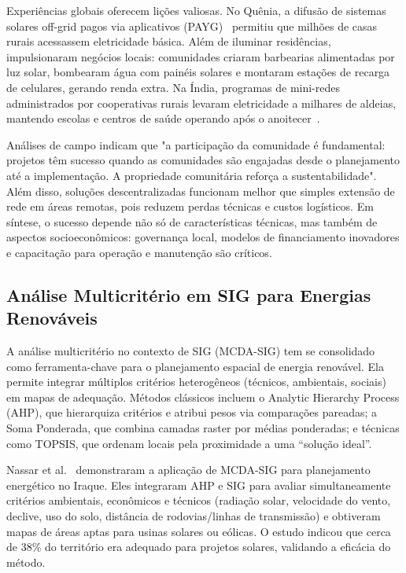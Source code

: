 \documentclass[12pt, a4paper]{article}
\begin{document}
Experiências globais oferecem lições valiosas. No Quênia, a difusão de sistemas solares off-grid pagos via aplicativos (PAYG)~\citep{Onyango2022} permitiu que milhões de casas rurais acessassem eletricidade básica. Além de iluminar residências, impulsionaram negócios locais: comunidades criaram barbearias alimentadas por luz solar, bombearam água com painéis solares e montaram estações de recarga de celulares, gerando renda extra. Na Índia, programas de mini-redes administrados por cooperativas rurais levaram eletricidade a milhares de aldeias, mantendo escolas e centros de saúde operando após o anoitecer~\citep{Mapako2021}.

Análises de campo indicam que "a participação da comunidade é fundamental: projetos têm sucesso quando as comunidades são engajadas desde o planejamento até a implementação. A propriedade comunitária reforça a sustentabilidade". Além disso, soluções descentralizadas funcionam melhor que simples extensão de rede em áreas remotas, pois reduzem perdas técnicas e custos logísticos. Em síntese, o sucesso depende não só de características técnicas, mas também de aspectos socioeconômicos: governança local, modelos de financiamento inovadores e capacitação para operação e manutenção são críticos.

\subsection{Análise Multicritério em SIG para Energias Renováveis}

A análise multicritério no contexto de SIG (MCDA-SIG) tem se consolidado como ferramenta-chave para o planejamento espacial de energia renovável. Ela permite integrar múltiplos critérios heterogêneos (técnicos, ambientais, sociais) em mapas de adequação. Métodos clássicos incluem o Analytic Hierarchy Process (AHP), que hierarquiza critérios e atribui pesos via comparações pareadas; a Soma Ponderada, que combina camadas raster por médias ponderadas; e técnicas como TOPSIS, que ordenam locais pela proximidade a uma ``solução ideal''.

Nassar et al.~\citep{Nassar2025} demonstraram a aplicação de MCDA-SIG para planejamento energético no Iraque. Eles integraram AHP e SIG para avaliar simultaneamente critérios ambientais, econômicos e técnicos (radiação solar, velocidade do vento, declive, uso do solo, distância de rodovias/linhas de transmissão) e obtiveram mapas de áreas aptas para usinas solares ou eólicas. O estudo indicou que cerca de 38\% do território era adequado para projetos solares, validando a eficácia do método.
\end{document}
